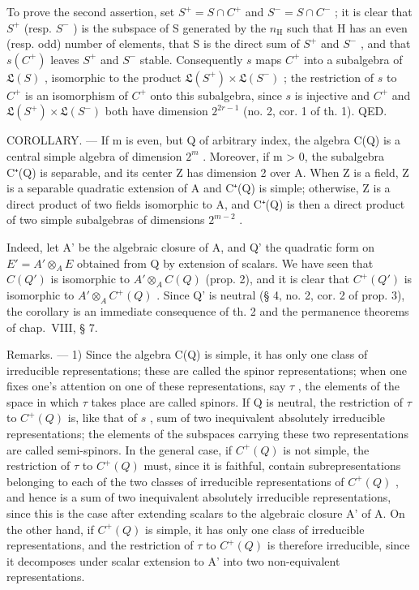 To prove the second assertion, set \(S^{+} = S \cap C^{+}\) and \(S^{-} = S \cap C^{-}\) ; it is clear that \(S^{+}\) (resp. \(S^{-}\) ) is the subspace of S generated by the \(n_{\mathrm{H}}\) such that H has an even (resp. odd) number of elements, that S is the direct sum of \(S^{+}\) and \(S^{-}\) , and that \(s(C^{+})\) leaves \(S^{+}\) and \(S^{-}\) stable. Consequently \(s\) maps \(C^{+}\) into a subalgebra of \(\mathfrak{L}(S)\) , isomorphic to the product \(\mathfrak{L}(S^{+}) \times \mathfrak{L}(S^{-})\) ; the restriction of \(s\) to \(C^{+}\) is an isomorphism of \(C^{+}\) onto this subalgebra, since \(s\) is injective and \(C^{+}\) and \(\mathfrak{L}(S^{+}) \times \mathfrak{L}(S^{-})\) both have dimension \(2^{2r-1}\) (no. 2, cor. 1 of th. 1). QED.

COROLLARY. --- If m is even, but Q of arbitrary index, the algebra C(Q) is a central simple algebra of dimension \(2^{m}\) . Moreover, if m \textgreater{} 0, the subalgebra C⁺(Q) is separable, and its center Z has dimension 2 over A. When Z is a field, Z is a separable quadratic extension of A and C⁺(Q) is simple; otherwise, Z is a direct product of two fields isomorphic to A, and C⁺(Q) is then a direct product of two simple subalgebras of dimensions \(2^{m-2}\) .

Indeed, let A' be the algebraic closure of A, and Q' the quadratic form on \(E' = A' \otimes_{A} E\) obtained from Q by extension of scalars. We have seen that \(C(Q')\) is isomorphic to \(A' \otimes_{A} C(Q)\) (prop. 2), and it is clear that \(C^{+}(Q')\) is isomorphic to \(A' \otimes_{A} C^{+}(Q)\) . Since Q' is neutral (§ 4, no. 2, cor. 2 of prop. 3), the corollary is an immediate consequence of th. 2 and the permanence theorems of chap.~VIII, § 7.

Remarks. --- 1) Since the algebra C(Q) is simple, it has only one class of irreducible representations; these are called the spinor representations; when one fixes one's attention on one of these representations, say \(\tau\) , the elements of the space in which \(\tau\) takes place are called spinors. If Q is neutral, the restriction of \(\tau\) to \(C^{+}(Q)\) is, like that of \(s\) , sum of two inequivalent absolutely irreducible representations; the elements of the subspaces carrying these two representations are called semi-spinors. In the general case, if \(C^{+}(Q)\) is not simple, the restriction of \(\tau\) to \(C^{+}(Q)\) must, since it is faithful, contain subrepresentations belonging to each of the two classes of irreducible representations of \(C^{+}(Q)\) , and hence is a sum of two inequivalent absolutely irreducible representations, since this is the case after extending scalars to the algebraic closure A' of A. On the other hand, if \(C^{+}(Q)\) is simple, it has only one class of irreducible representations, and the restriction of \(\tau\) to \(C^{+}(Q)\) is therefore irreducible, since it decomposes under scalar extension to A' into two non-equivalent representations.

